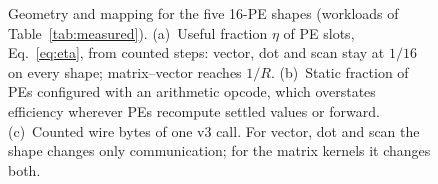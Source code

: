 \begin{figure}[t]
  \centering
  \resizebox{\textwidth}{!}{}
  \caption{Geometry and mapping for the five 16-PE shapes (workloads of
  Table~\ref{tab:measured}). (a)~Useful fraction $\eta$ of PE slots,
  Eq.~\eqref{eq:eta}, from counted steps: vector, dot and scan stay at
  $1/16$ on every shape; matrix--vector reaches $1/R$. (b)~Static fraction of
  PEs configured with an arithmetic opcode, which overstates efficiency
  wherever PEs recompute settled values or forward. (c)~Counted wire bytes
  of one v3 call. For vector, dot and scan the shape changes only
  communication; for the matrix kernels it changes both.}
  \label{fig:tradeoff}
\end{figure}
